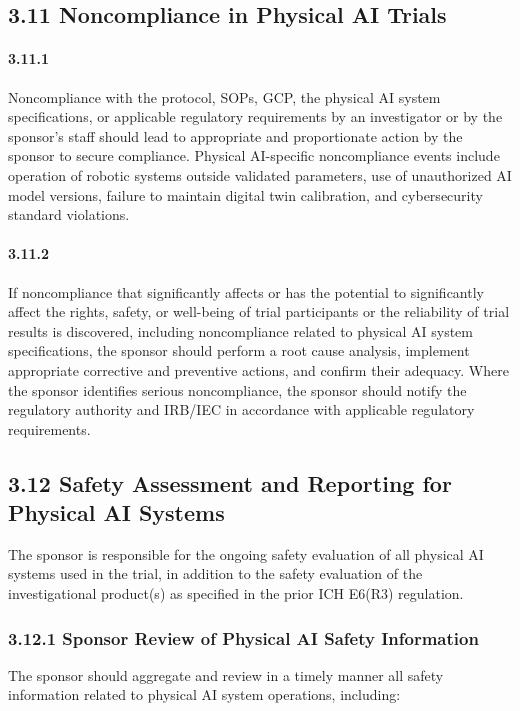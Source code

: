 \subsection{3.11 Noncompliance in Physical AI Trials}

\paragraph{3.11.1} Noncompliance with the protocol, SOPs, GCP, the physical AI system specifications, or applicable regulatory requirements by an investigator or by the sponsor's staff should lead to appropriate and proportionate action by the sponsor to secure compliance. Physical AI-specific noncompliance events include operation of robotic systems outside validated parameters, use of unauthorized AI model versions, failure to maintain digital twin calibration, and cybersecurity standard violations.

\paragraph{3.11.2} If noncompliance that significantly affects or has the potential to significantly affect the rights, safety, or well-being of trial participants or the reliability of trial results is discovered, including noncompliance related to physical AI system specifications, the sponsor should perform a root cause analysis, implement appropriate corrective and preventive actions, and confirm their adequacy. Where the sponsor identifies serious noncompliance, the sponsor should notify the regulatory authority and IRB/IEC in accordance with applicable regulatory requirements.

\subsection{3.12 Safety Assessment and Reporting for Physical AI Systems}

The sponsor is responsible for the ongoing safety evaluation of all physical AI systems used in the trial, in addition to the safety evaluation of the investigational product(s) as specified in the prior ICH E6(R3) regulation.

\subsubsection{3.12.1 Sponsor Review of Physical AI Safety Information}

The sponsor should aggregate and review in a timely manner all safety information related to physical AI system operations, including:

